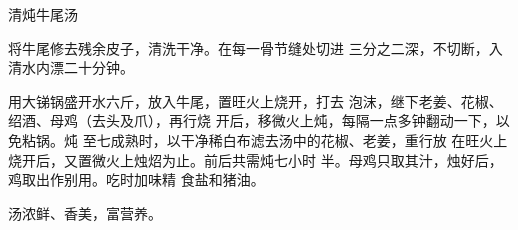 \begin{recipe}{清炖牛尾汤}

\ingredients



\cooking

将牛尾修去残余皮子，清洗干净。在每一骨节缝处切进 三分之二深，不切断，入清水内漂二十分钟。

用大锑锅盛开水六斤，放入牛尾，置旺火上烧开，打去 泡沫，继下老姜、花椒、绍酒、母鸡（去头及爪），再行烧 开后，移微火上炖，每隔一点多钟翻动一下，以免粘锅。炖 至七成熟时，以干净稀白布滤去汤中的花椒、老姜，重行放 在旺火上烧开后，又置微火上烛炤为止。前后共需炖七小时 半。母鸡只取其汁，烛好后，鸡取出作别用。吃时加味精 食盐和猪油。

\notes

汤浓鲜、香美，富营养。

\end{recipe}

